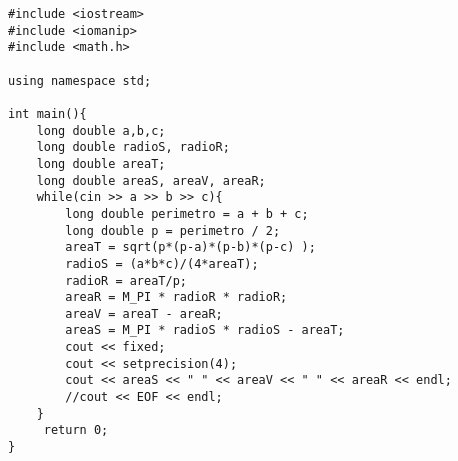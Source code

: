 \begin{verbatim}
#include <iostream>
#include <iomanip>
#include <math.h>

using namespace std;

int main(){
	long double a,b,c;
	long double radioS, radioR;
	long double areaT;
	long double areaS, areaV, areaR;
	while(cin >> a >> b >> c){
		long double perimetro = a + b + c;
		long double p = perimetro / 2;
		areaT = sqrt(p*(p-a)*(p-b)*(p-c) );
		radioS = (a*b*c)/(4*areaT);
		radioR = areaT/p;
		areaR = M_PI * radioR * radioR;
		areaV = areaT - areaR;
		areaS = M_PI * radioS * radioS - areaT;
		cout << fixed;
		cout << setprecision(4);
		cout << areaS << " " << areaV << " " << areaR << endl;
		//cout << EOF << endl;
	}
	 return 0;
}
\end{verbatim}

